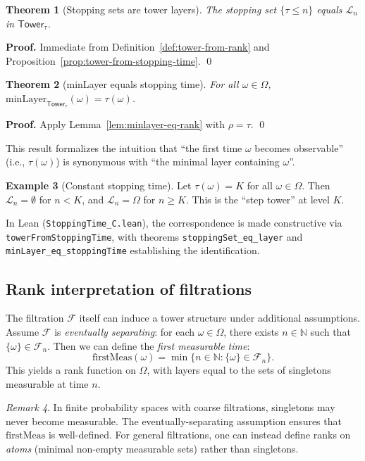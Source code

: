 \documentclass[11pt]{article}
\newtheorem{theorem}{Theorem}[section]
\theoremstyle{definition}
\newtheorem{example}[theorem]{Example}
\theoremstyle{remark}
\newtheorem{remark}[theorem]{Remark}
\newcommand{\layer}{\mathcal{L}}
\newcommand{\minLayer}{\mathrm{minLayer}}
\newcommand{\Tower}{\mathsf{Tower}}
\newcommand{\Filtration}{\mathcal{F}}
\newcommand{\NN}{\mathbb{N}}
\begin{document}
\begin{theorem}[Stopping sets are tower layers]
\label{thm:stopping-set-eq-layer}
The stopping set $\{\tau \leq n\}$ equals $\layer_n$ in $\Tower_\tau$.
\end{theorem}

\noindent\textbf{Proof.}
Immediate from Definition~\ref{def:tower-from-rank} and Proposition~\ref{prop:tower-from-stopping-time}.
\qed

\begin{theorem}[minLayer equals stopping time]
\label{thm:minlayer-eq-stopping}
For all $\omega \in \Omega$, $\minLayer_{\Tower_\tau}(\omega) = \tau(\omega)$.
\end{theorem}

\noindent\textbf{Proof.}
Apply Lemma~\ref{lem:minlayer-eq-rank} with $\rho = \tau$.
\qed

This result formalizes the intuition that ``the first time $\omega$ becomes observable'' (i.e., $\tau(\omega)$) is synonymous with ``the minimal layer containing $\omega$''.

\begin{example}[Constant stopping time]
\label{ex:constant-stopping}
Let $\tau(\omega) = K$ for all $\omega \in \Omega$.
Then $\layer_n = \emptyset$ for $n < K$, and $\layer_n = \Omega$ for $n \geq K$.
This is the ``step tower'' at level $K$.
\end{example}

In Lean (\texttt{StoppingTime\_C.lean}), the correspondence is made constructive via \texttt{towerFromStoppingTime}, with theorems \texttt{stoppingSet\_eq\_layer} and \texttt{minLayer\_eq\_stoppingTime} establishing the identification.

\subsection{Rank interpretation of filtrations}

The filtration $\Filtration$ itself can induce a tower structure under additional assumptions.
Assume $\Filtration$ is \emph{eventually separating}: for each $\omega \in \Omega$, there exists $n \in \NN$ such that $\{\omega\} \in \Filtration_n$.
Then we can define the \emph{first measurable time}:
\[
\mathrm{firstMeas}(\omega) = \min\{n \in \NN : \{\omega\} \in \Filtration_n\}.
\]
This yields a rank function on $\Omega$, with layers equal to the sets of singletons measurable at time $n$.

\begin{remark}
In finite probability spaces with coarse filtrations, singletons may never become measurable.
The eventually-separating assumption ensures that $\mathrm{firstMeas}$ is well-defined.
For general filtrations, one can instead define ranks on \emph{atoms} (minimal non-empty measurable sets) rather than singletons.
\end{remark}
\end{document}
